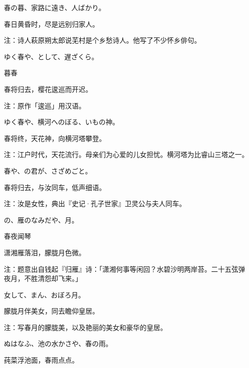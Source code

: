 \begin{haiku}
    {\FH 春の暮、家路に遠き、人ばかり。}

    {\FK 春日黄昏时，尽是远别归家人。}

    {\FT 注：诗人萩原朔太郎说芜村是个乡愁诗人。他写了不少怀乡俳句。}
\end{haiku}

\begin{haiku}
    {\FH ゆく春や、として、遅ざくら。}

    {\FK 暮春}

    {\FK 春将归去，樱花逡巡而开迟。}

    {\FT 注：原作「逡巡」用汉语。}
\end{haiku}

\begin{haiku}
    {\FH ゆく春や、横河へのぼる、いもの神。}

    {\FK 春将终，天花神，向横河塔攀登。}

    {\FT 注：江户时代，天花流行。母亲们为心爱的儿女担忧。横河塔为比睿山三塔之一。}
\end{haiku}

\begin{haiku}
    {\FH 春や、の君が、さざめごと。}

    {\FK 春将归去，与汝同车，低声细语。}

    {\FT 注：汝是女性，典出『史记·孔子世家』卫灵公与夫人同车。}
\end{haiku}

\begin{haiku}
    {\FH {}の、雁のなみだや、月。}

    {\FK 春夜闻琴}

    {\FK 潇湘雁落泪，朦胧月色微。}

    {\FT 注：题意出自钱起『归雁』诗：「潇湘何事等闲回？水碧沙明两岸苔。二十五弦弹夜月，不胜清怨却飞来。」}
\end{haiku}

\begin{haiku}
    {\FH 女して、まん、おぼろ月。}

    {\FK 朦胧月伴美女，同去瞻仰皇居。}

    {\FT 注：写春月的朦胧美，以及艳丽的美女和豪华的皇居。}
\end{haiku}

\begin{haiku}
    {\FH ぬはなふ、池の水かさや、春の雨。}

    {\FK 莼菜浮池面，春雨点点。}
\end{haiku}

